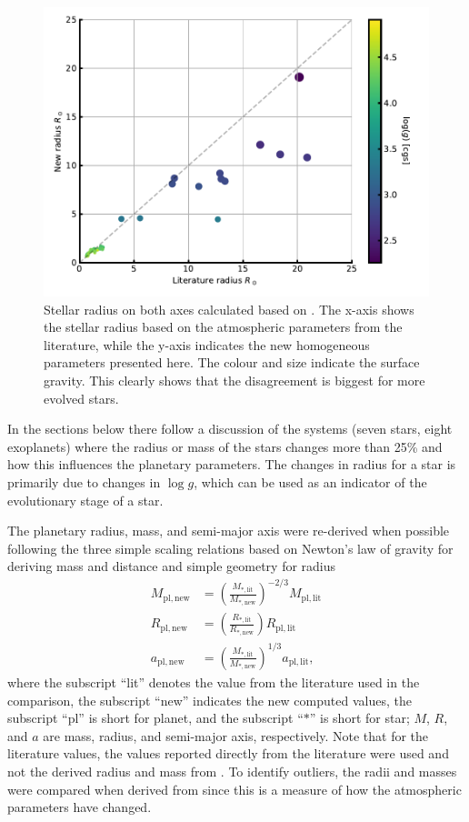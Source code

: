 \begin{figure}[tpb]
    \centering
    \includegraphics[width=0.8\linewidth]{figures/radiusVSradius.pdf}
    \caption{Stellar radius on both axes calculated based on \citet{Torres2010}. The x-axis shows
             the stellar radius based on the atmospheric parameters from the literature, while the
             y-axis indicates the new homogeneous parameters presented here. The colour and size
             indicate the surface gravity. This clearly shows that the disagreement is biggest for
             more evolved stars.}
    \label{fig:RR}
\end{figure}

In the sections below there follow a discussion of the systems (seven stars, eight exoplanets) where
the radius or mass of the stars changes more than 25\% and how this influences the planetary
parameters. The changes in radius for a star is primarily due to changes in $\log g$, which can be
used as an indicator of the evolutionary stage of a star.

The planetary radius, mass, and semi-major axis were re-derived when possible following the three
simple scaling relations based on Newton's law of gravity \citep{Newton1687} for deriving mass and
distance and simple geometry for radius \citep[see e.g.][]{Torres2008}
\begin{align}
    M_\mathrm{pl,new} &= \left(\frac{M_\mathrm{\ast,lit}}{M_\mathrm{\ast,new}}\right)^{-2/3} M_\mathrm{pl,lit}  \\
    R_\mathrm{pl,new} &= \left(\frac{R_\mathrm{\ast,lit}}{R_\mathrm{\ast,new}}\right) R_\mathrm{pl,lit} \\
    a_\mathrm{pl,new} &= \left(\frac{M_\mathrm{\ast,lit}}{M_\mathrm{\ast,new}}\right)^{1/3} a_\mathrm{pl,lit},
\end{align}
where the subscript ``lit'' denotes the value from the literature used in the comparison, the
subscript ``new'' indicates the new computed values, the subscript ``pl'' is short for planet, and
the subscript ``$\ast$'' is short for star; $M$, $R$, and $a$ are mass, radius, and semi-major axis,
respectively. Note that for the literature values, the values reported directly from the literature
were used and not the derived radius and mass from \citet{Torres2010}. To identify outliers, the
radii and masses were compared when derived from \citet{Torres2010} since this is a measure of how
the atmospheric parameters have changed.


